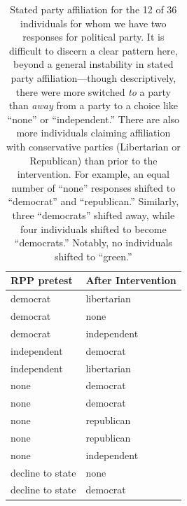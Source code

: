 \begin{table}[ht]
\centering
\caption{Stated party affiliation for the 12 of 36 individuals for whom we have
    two responses for political party. It is difficult to discern a clear
    pattern here, beyond a general instability in stated party
    affiliation---though descriptively, there were more switched \emph{to} a
    party than \emph{away} from a party to a choice like “none” or
    “independent.” There are also more individuals claiming affiliation with
    conservative parties (Libertarian or Republican) than prior to the
    intervention. For example, an equal number of “none” responses shifted to
    “democrat” and “republican.” Similarly, three “democrats” shifted away, while
    four individuals shifted to become “democrats.” Notably, no individuals
    shifted to “green.”}
\label{table:mech-rpp-party-shifts}
\begin{tabular}{ll}
  \toprule
 RPP pretest & After Intervention \\ 
  \midrule
   democrat & libertarian \\ 
   democrat & none \\ 
   democrat & independent \\ 
   independent & democrat \\ 
   independent & libertarian \\ 
   none & democrat \\ 
   none & democrat \\ 
   none & republican \\ 
   none & republican \\ 
   none & independent \\ 
   decline to state & none \\ 
   decline to state & democrat \\ 
   \bottomrule
\end{tabular}
\end{table}

